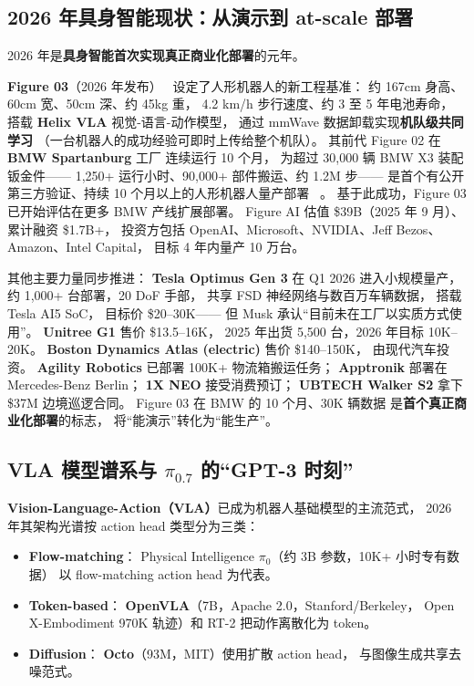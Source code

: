\subsection{2026 年具身智能现状：从演示到 at-scale 部署}

2026 年是\textbf{具身智能首次实现真正商业化部署}的元年。

\textbf{Figure 03}（2026 年发布）~\cite{figure_03_bmw_2026}
设定了人形机器人的新工程基准：
约 167cm 身高、60cm 宽、50cm 深、约 45kg 重，
4.2 km/h 步行速度、约 3 至 5 年电池寿命，
搭载 \textbf{Helix VLA} 视觉-语言-动作模型，
通过 mmWave 数据卸载实现\textbf{机队级共同学习}
（一台机器人的成功经验可即时上传给整个机队）。
其前代 Figure 02 在 \textbf{BMW Spartanburg} 工厂
连续运行 10 个月，
为超过 30,000 辆 BMW X3 装配钣金件——
1,250+ 运行小时、90,000+ 部件搬运、约 1.2M 步——
是首个有公开第三方验证、持续 10 个月以上的人形机器人量产部署%
~\cite{bmw_figure02_2026}。
基于此成功，Figure 03 已开始评估在更多 BMW 产线扩展部署。
Figure AI 估值 \$39B（2025 年 9 月）、累计融资 \$1.7B+，
投资方包括 OpenAI、Microsoft、NVIDIA、Jeff Bezos、Amazon、Intel Capital，
目标 4 年内量产 10 万台。

其他主要力量同步推进：
\textbf{Tesla Optimus Gen 3} 在 Q1 2026 进入小规模量产，
约 1,000+ 台部署，20 DoF 手部，
共享 FSD 神经网络与数百万车辆数据，
搭载 Tesla AI5 SoC，
目标价 \$20--30K——
但 Musk 承认“目前未在工厂以实质方式使用”。
\textbf{Unitree G1} 售价 \$13.5--16K，
2025 年出货 5,500 台，2026 年目标 10K--20K。
\textbf{Boston Dynamics Atlas (electric)} 售价 \$140--150K，
由现代汽车投资。
\textbf{Agility Robotics} 已部署 100K+ 物流箱搬运任务；
\textbf{Apptronik} 部署在 Mercedes-Benz Berlin；
\textbf{1X NEO} 接受消费预订；
\textbf{UBTECH Walker S2} 拿下 \$37M 边境巡逻合同。
Figure 03 在 BMW 的 10 个月、30K 辆数据
是\textbf{首个真正商业化部署}的标志，
将“能演示”转化为“能生产”。

\subsection{VLA 模型谱系与 \texorpdfstring{$\pi_{0.7}$}{pi-0.7} 的“GPT-3 时刻”}

\textbf{Vision-Language-Action（VLA）}已成为机器人基础模型的主流范式，
2026 年其架构光谱按 action head 类型分为三类：

\begin{itemize}[noitemsep]
  \item \textbf{Flow-matching}：
        Physical Intelligence \textbf{$\pi_0$}（约 3B 参数，10K+ 小时专有数据）
        以 flow-matching action head 为代表。
  \item \textbf{Token-based}：
        \textbf{OpenVLA}（7B，Apache 2.0，Stanford/Berkeley，
        Open X-Embodiment 970K 轨迹）和 RT-2 把动作离散化为 token。
  \item \textbf{Diffusion}：
        \textbf{Octo}（93M，MIT）使用扩散 action head，
        与图像生成共享去噪范式。
\end{itemize}

